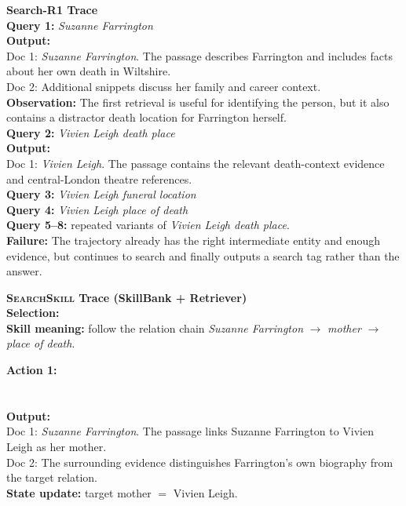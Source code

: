 \documentclass{article}
\newcommand{\Ours}{\textsc{SearchSkill}\xspace}
\begin{document}
\casedash
\noindent\textcolor{red!75!black}{\textbf{Search-R1 Trace}}\\
\textbf{Query 1:} \emph{Suzanne Farrington}\\
\textbf{Output:}\\
Doc 1: \emph{Suzanne Farrington}. The passage describes Farrington and includes facts about her own death in Wiltshire.\\
Doc 2: Additional snippets discuss her family and career context.\\
\textbf{Observation:} The first retrieval is useful for identifying the person, but it also contains a distractor death location for Farrington herself.\\
\textbf{Query 2:} \emph{Vivien Leigh death place}\\
\textbf{Output:}\\
Doc 1: \emph{Vivien Leigh}. The passage contains the relevant death-context evidence and central-London theatre references.\\
\textbf{Query 3:} \emph{Vivien Leigh funeral location}\\
\textbf{Query 4:} \emph{Vivien Leigh place of death}\\
\textbf{Query 5--8:} repeated variants of \emph{Vivien Leigh death place}.\\
\textbf{Failure:} The trajectory already has the right intermediate entity and enough evidence, but continues to search and finally outputs a search tag rather than the answer.

\casedash
\noindent\textcolor{blue!75!black}{\textbf{\Ours Trace (SkillBank + Retriever)}}\\
\textbf{Selection:} \\
\textbf{Skill meaning:} follow the relation chain \emph{Suzanne Farrington} \(\rightarrow\) \emph{mother} \(\rightarrow\) \emph{place of death}.

\textbf{Action 1:}\\
\\
\\
\textbf{Output:}\\
Doc 1: \emph{Suzanne Farrington}. The passage links Suzanne Farrington to Vivien Leigh as her mother.\\
Doc 2: The surrounding evidence distinguishes Farrington's own biography from the target relation.\\
\textbf{State update:} target mother \(=\) Vivien Leigh.
\end{document}
